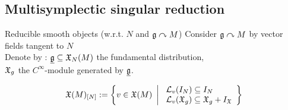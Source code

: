\documentclass[10pt]{beamer}
\makeatletter
\renewcommand{\action}{\curvearrowright}
\def\blfootnote{\gdef\@thefnmark{}\@footnotetext}
\makeatother
\begin{document}
    \subsection{Multisymplectic singular reduction}
      \begin{frame}{Reducible smooth objects \quad \small (w.r.t. $N$ and $\g\action M$)}
        Consider $\g \action M$ by vector fields tangent to $N$ %
        \\
        \vfill
        Denote by :
        \hspace{1em} $\underline{\mathfrak{g}}\subseteq \mathfrak{X}_N(M)$ the fundamental distribution,
        \\
        \hspace{6.5em}  $\mathfrak{X}_g$ the $C^\infty$-module generated by $\underline{\mathfrak{g}}$.
        \\
        \vfill
        \begin{defblock}
          \begin{displaymath}
            \mathfrak{X}(M)_{[N]} :=
            \left\lbrace
            v \in \mathfrak{X}(M)
            ~\left\vert~
            \begin{array}{l}
              \mathcal{L}_v (I_N) \subseteq I_N	\\
              \mathcal{L}_v (\mathfrak{X}_g) \subseteq \mathfrak{X}_g + I_{\mathfrak{X}}
            \end{array}
    \right\rbrace\right.
          \end{displaymath}
    

\end{defblock}
\end{frame}
\end{document}
